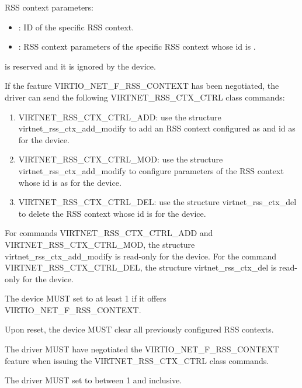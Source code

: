 RSS context parameters:
\begin{itemize}
\item  {}: ID of the specific RSS context.
\item  {}: RSS context parameters of the specific RSS context whose id is .
\end{itemize}

 is reserved and it is ignored by the device.

If the feature VIRTIO_NET_F_RSS_CONTEXT has been negotiated, the driver can send the following
VIRTNET_RSS_CTX_CTRL class commands:
\begin{enumerate}
\item VIRTNET_RSS_CTX_CTRL_ADD: use the structure virtnet_rss_ctx_add_modify to
       add an RSS context configured as  and id as  for the device.
\item VIRTNET_RSS_CTX_CTRL_MOD: use the structure virtnet_rss_ctx_add_modify to
       configure parameters of the RSS context whose id is  as  for the device.
\item VIRTNET_RSS_CTX_CTRL_DEL: use the structure virtnet_rss_ctx_del to delete
       the RSS context whose id is  for the device.
\end{enumerate}

For commands VIRTNET_RSS_CTX_CTRL_ADD and VIRTNET_RSS_CTX_CTRL_MOD, the structure virtnet_rss_ctx_add_modify is read-only for the device.
For the command VIRTNET_RSS_CTX_CTRL_DEL, the structure virtnet_rss_ctx_del is read-only for the device.


The device MUST set  to at least 1 if it offers VIRTIO_NET_F_RSS_CONTEXT.

Upon reset, the device MUST clear all previously configured RSS contexts.


The driver MUST have negotiated the VIRTIO_NET_F_RSS_CONTEXT feature when issuing the VIRTNET_RSS_CTX_CTRL class commands.

The driver MUST set  to between 1 and  inclusive.


